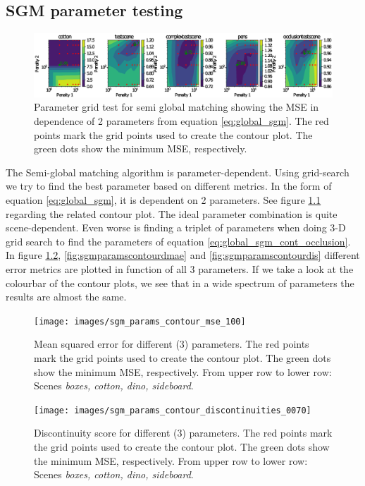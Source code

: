 \documentclass  [
  paper    = a4,
  BCOR     = 10mm,
  twoside,
  fontsize = 12pt,
  fleqn,
  toc      = bibnumbered,
  toc      = listofnumbered,
  numbers  = noendperiod,
  headings = normal,
  listof   = leveldown,
  version  = 3.03
]                                       {scrreprt}
\begin{document}
\begin{appendix}
  	\chapter{SGM parameter testing}
	\begin{figure}[h!]
  		\centering
  		\includegraphics[width=1\linewidth]{images/sgm_param_contour}
  		\caption[Parameter grid test for semi global matching]{Parameter grid test for semi global matching showing the MSE in dependence of 2 parameters from equation \ref{eq:global_sgm}. The red points mark the grid points used to create the contour plot. The green dots show the minimum MSE, respectively.}
  		\label{fig:sgmparamcontour}
  	\end{figure}
  	The Semi-global matching algorithm is parameter-dependent. Using grid-search we try to find the best parameter based on different metrics. In the form of equation \ref{eq:global_sgm}, it is dependent on 2 parameters. See figure \ref{fig:sgmparamcontour} regarding the related contour plot. The ideal parameter combination is quite scene-dependent. Even worse is finding a triplet of parameters when doing 3-D grid search to find the parameters of equation \ref{eq:global_sgm_cont_occlusion}. In figure \ref{fig:sgmparamscontourmse100}, \ref{fig:sgmparamscontourdmae} and \ref{fig:sgmparamscontourdis} different error metrics are plotted in function of all 3 parameters. If we take a look at the colourbar of the contour plots, we see that in a wide spectrum of parameters the results are almost the same.
  	\begin{figure}[h!]
  		\centering
  		\texttt{[image: images/sgm\_params\_contour\_mse\_100]}
  		\caption[Mean squared error for different (3) parameters]{Mean squared error for different (3) parameters. The red points mark the grid points used to create the contour plot. The green dots show the minimum MSE, respectively. From upper row to lower row: Scenes \textit{boxes, cotton, dino, sideboard}.}
  		\label{fig:sgmparamscontourmse100}
  	\end{figure}
  	\begin{figure}[h!]
  		\centering
  		\texttt{[image: images/sgm\_params\_contour\_discontinuities\_0070]}
  		\caption[Discontinuity score for different (3) parameters]{Discontinuity score for different (3) parameters. The red points mark the grid points used to create the contour plot. The green dots show the minimum MSE, respectively. From upper row to lower row: Scenes \textit{boxes, cotton, dino, sideboard}.}

\end{figure}
\end{appendix}
\end{document}
